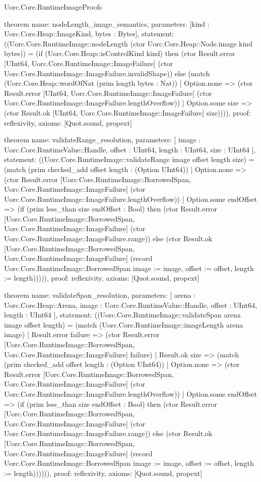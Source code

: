 \begin{lexlean}{Uorc.Core.RuntimeImageProofs}
\begin{semanticmodule}
theorem{
  name: nodeLength_image_semantics,
  parameters: [kind : Uorc.Core.Heap::ImageKind, bytes : Bytes],
  statement: ((Uorc.Core.RuntimeImage::nodeLength (ctor Uorc.Core.Heap::Node.image kind bytes)) = (if (Uorc.Core.Heap::isControlKind kind) then (ctor Result.error [UInt64, Uorc.Core.RuntimeImage::ImageFailure] (ctor Uorc.Core.RuntimeImage::ImageFailure.invalidShape)) else (match (Uorc.Core.Heap::wordOfNat (prim length bytes : Nat))
    | Option.none => (ctor Result.error [UInt64, Uorc.Core.RuntimeImage::ImageFailure] (ctor Uorc.Core.RuntimeImage::ImageFailure.lengthOverflow))
    | Option.some size => (ctor Result.ok [UInt64, Uorc.Core.RuntimeImage::ImageFailure] size)))),
  proof: reflexivity{},
  axioms: [Quot.sound, propext]
}

theorem{
  name: validateRange_resolution,
  parameters: [
    image : Uorc.Core.RuntimeValue::Handle,
    offset : UInt64,
    length : UInt64,
    size : UInt64
  ],
  statement: ((Uorc.Core.RuntimeImage::validateRange image offset length size) = (match (prim checked_add offset length : (Option UInt64))
    | Option.none => (ctor Result.error [Uorc.Core.RuntimeImage::BorrowedSpan, Uorc.Core.RuntimeImage::ImageFailure] (ctor Uorc.Core.RuntimeImage::ImageFailure.lengthOverflow))
    | Option.some endOffset => (if (prim less_than size endOffset : Bool) then (ctor Result.error [Uorc.Core.RuntimeImage::BorrowedSpan, Uorc.Core.RuntimeImage::ImageFailure] (ctor Uorc.Core.RuntimeImage::ImageFailure.range)) else (ctor Result.ok [Uorc.Core.RuntimeImage::BorrowedSpan, Uorc.Core.RuntimeImage::ImageFailure] (record Uorc.Core.RuntimeImage::BorrowedSpan {image := image, offset := offset, length := length}))))),
  proof: reflexivity{},
  axioms: [Quot.sound, propext]
}

theorem{
  name: validateSpan_resolution,
  parameters: [
    arena : Uorc.Core.Heap::Arena,
    image : Uorc.Core.RuntimeValue::Handle,
    offset : UInt64,
    length : UInt64
  ],
  statement: ((Uorc.Core.RuntimeImage::validateSpan arena image offset length) = (match (Uorc.Core.RuntimeImage::imageLength arena image)
    | Result.error failure => (ctor Result.error [Uorc.Core.RuntimeImage::BorrowedSpan, Uorc.Core.RuntimeImage::ImageFailure] failure)
    | Result.ok size => (match (prim checked_add offset length : (Option UInt64))
      | Option.none => (ctor Result.error [Uorc.Core.RuntimeImage::BorrowedSpan, Uorc.Core.RuntimeImage::ImageFailure] (ctor Uorc.Core.RuntimeImage::ImageFailure.lengthOverflow))
      | Option.some endOffset => (if (prim less_than size endOffset : Bool) then (ctor Result.error [Uorc.Core.RuntimeImage::BorrowedSpan, Uorc.Core.RuntimeImage::ImageFailure] (ctor Uorc.Core.RuntimeImage::ImageFailure.range)) else (ctor Result.ok [Uorc.Core.RuntimeImage::BorrowedSpan, Uorc.Core.RuntimeImage::ImageFailure] (record Uorc.Core.RuntimeImage::BorrowedSpan {image := image, offset := offset, length := length})))))),
  proof: reflexivity{},
  axioms: [Quot.sound, propext]
}
\end{semanticmodule}

\end{lexlean}

